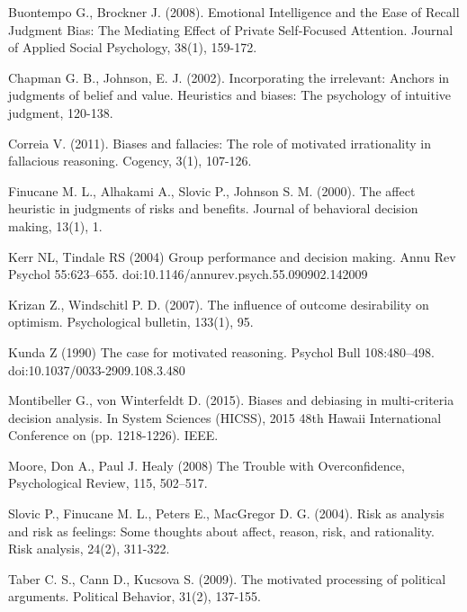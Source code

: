 \documentclass[a4paper,11pt]{article}
\begin{document}

\begin{thebibliography}{}

Buontempo G., Brockner J. (2008). Emotional Intelligence and the Ease of Recall Judgment Bias: The Mediating Effect of Private Self‐Focused Attention. Journal of Applied Social Psychology, 38(1), 159-172.

Chapman G. B., Johnson, E. J. (2002). Incorporating the irrelevant: Anchors in judgments of belief and value. Heuristics and biases: The psychology of intuitive judgment, 120-138.

Correia V. (2011). Biases and fallacies: The role of motivated irrationality in fallacious reasoning. Cogency, 3(1), 107-126.

Finucane M. L., Alhakami A., Slovic P., Johnson S. M. (2000). The affect heuristic in judgments of risks and benefits. Journal of behavioral decision making, 13(1), 1.

Kerr NL, Tindale RS (2004) Group performance and decision making. Annu Rev Psychol 55:623–655. doi:10.1146/annurev.psych.55.090902.142009

Krizan Z., Windschitl P. D. (2007). The influence of outcome desirability on optimism. Psychological bulletin, 133(1), 95.

Kunda Z (1990) The case for motivated reasoning. Psychol Bull 108:480–498. doi:10.1037/0033-2909.108.3.480

Montibeller G., von Winterfeldt D. (2015). Biases and debiasing in multi-criteria decision analysis. In System Sciences (HICSS), 2015 48th Hawaii International Conference on (pp. 1218-1226). IEEE.

Moore, Don A., Paul J. Healy (2008) The Trouble with Overconfidence, Psychological Review, 115, 502–517.

Slovic P., Finucane M. L., Peters E., MacGregor D. G. (2004). Risk as analysis and risk as feelings: Some thoughts about affect, reason, risk, and rationality. Risk analysis, 24(2), 311-322.

Taber C. S., Cann D., Kucsova S. (2009). The motivated processing of political arguments. Political Behavior, 31(2), 137-155.


\end{thebibliography}
\end{document}
